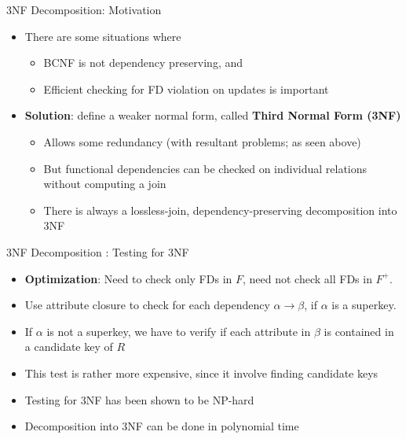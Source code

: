 \documentclass[aspectratio=169, xcolor=dvipsnames]{beamer}
\begin{document}
\begin{frame}{3NF Decomposition: Motivation}
    \begin{itemize}[<+->]
        \item There are some situations where
        \begin{itemize}
            \item[$\triangleright$] BCNF is not dependency preserving, and
            \item[$\triangleright$] Efficient checking for FD violation on updates is important
        \end{itemize}
        \item \textbf{Solution}: define a weaker normal form, called \textbf{Third Normal Form (3NF)}
        \begin{itemize}
            \item[$\triangleright$] Allows some redundancy (with resultant problems; as seen above)
            \item[$\triangleright$] But functional dependencies can be checked on individual relations without computing a join
            \item[$\triangleright$] There is always a lossless-join, dependency-preserving decomposition into 3NF
        \end{itemize}
    \end{itemize}
\end{frame}

\begin{frame}{3NF Decomposition : Testing for 3NF}
    \begin{itemize}[<+->]
        \item \textbf{Optimization}: Need to check only FDs in $F$, need not check all FDs in $F^+$.
        \item Use attribute closure to check for each dependency $\alpha \rightarrow \beta$, if $\alpha$ is a superkey.
        \item If $\alpha$ is not a superkey, we have to verify if each attribute in $\beta$ is contained in a candidate key of $R$
        \item This test is rather more expensive, since it involve finding candidate keys
        \item Testing for 3NF has been shown to be NP-hard
        \item Decomposition into 3NF can be done in polynomial time
    \end{itemize}
\end{frame}
\end{document}
